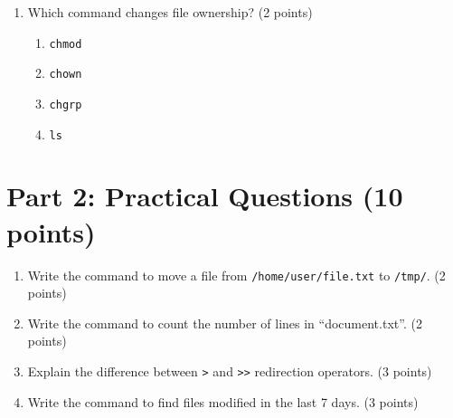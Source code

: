 \documentclass[11pt,a4paper]{article}
\begin{document}
{\begin{enumerate}[label=\textbf{\arabic*.}]
    \item Which command changes file ownership? (2 points)
    \begin{enumerate}[label=(\alph*)]
        \item \texttt{chmod}
        \item \texttt{chown}
        \item \texttt{chgrp}
        \item \texttt{ls}
    \end{enumerate}
\end{enumerate}

\section*{Part 2: Practical Questions (10 points)}

\begin{enumerate}[label=\textbf{\arabic*.}, resume]
    \item Write the command to move a file from \texttt{/home/user/file.txt} to \texttt{/tmp/}. (2 points)
    
    \vspace{2cm}
    
    \item Write the command to count the number of lines in ``document.txt''. (2 points)
    
    \vspace{2cm}
    
    \item Explain the difference between \texttt{>} and \texttt{>>} redirection operators. (3 points)
    
    \vspace{3cm}
    
    \item Write the command to find files modified in the last 7 days. (3 points)
    
    \vspace{3cm}
\end{enumerate}
}
\end{document}
